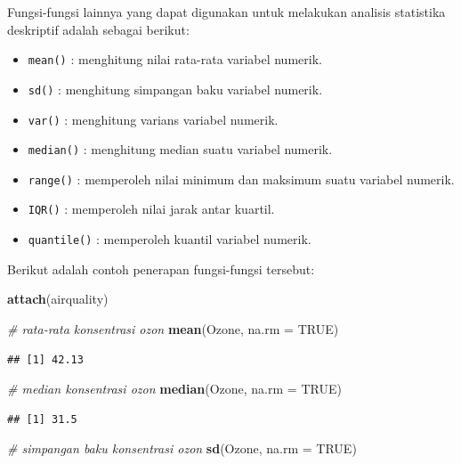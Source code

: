\documentclass[
]{book}
\newenvironment{Shaded}{\begin{snugshade}}{\end{snugshade}}
\newcommand{\AttributeTok}[1]{\textcolor[rgb]{0.13,0.29,0.53}{#1}}
\newcommand{\CommentTok}[1]{\textcolor[rgb]{0.56,0.35,0.01}{\textit{#1}}}
\newcommand{\ConstantTok}[1]{\textcolor[rgb]{0.56,0.35,0.01}{#1}}
\newcommand{\FunctionTok}[1]{\textcolor[rgb]{0.13,0.29,0.53}{\textbf{#1}}}
\newcommand{\NormalTok}[1]{#1}
\providecommand{\tightlist}{%
  \setlength{\itemsep}{0pt}\setlength{\parskip}{0pt}}
\theoremstyle{definition}
\theoremstyle{definition}
\theoremstyle{definition}
\theoremstyle{definition}
\theoremstyle{remark}
\begin{document}
Fungsi-fungsi lainnya yang dapat digunakan untuk melakukan analisis statistika deskriptif adalah sebagai berikut:

\begin{itemize}
\tightlist
\item
  \texttt{mean()} : menghitung nilai rata-rata variabel numerik.
\item
  \texttt{sd()} : menghitung simpangan baku variabel numerik.
\item
  \texttt{var()} : menghitung varians variabel numerik.
\item
  \texttt{median()} : menghitung median suatu variabel numerik.
\item
  \texttt{range()} : memperoleh nilai minimum dan maksimum suatu variabel numerik.
\item
  \texttt{IQR()} : memperoleh nilai jarak antar kuartil.
\item
  \texttt{quantile()} : memperoleh kuantil variabel numerik.
\end{itemize}

Berikut adalah contoh penerapan fungsi-fungsi tersebut:

\begin{Shaded}
\begin{Highlighting}[]
\FunctionTok{attach}\NormalTok{(airquality)}

\CommentTok{\# rata{-}rata konsentrasi ozon}
\FunctionTok{mean}\NormalTok{(Ozone, }\AttributeTok{na.rm =} \ConstantTok{TRUE}\NormalTok{)}
\end{Highlighting}
\end{Shaded}

\begin{verbatim}
## [1] 42.13
\end{verbatim}

\begin{Shaded}
\begin{Highlighting}[]
\CommentTok{\# median konsentrasi ozon}
\FunctionTok{median}\NormalTok{(Ozone, }\AttributeTok{na.rm =} \ConstantTok{TRUE}\NormalTok{)}
\end{Highlighting}
\end{Shaded}

\begin{verbatim}
## [1] 31.5
\end{verbatim}

\begin{Shaded}
\begin{Highlighting}[]
\CommentTok{\# simpangan baku konsentrasi ozon}
\FunctionTok{sd}\NormalTok{(Ozone, }\AttributeTok{na.rm =} \ConstantTok{TRUE}\NormalTok{)}
\end{Highlighting}
\end{Shaded}
\end{document}
